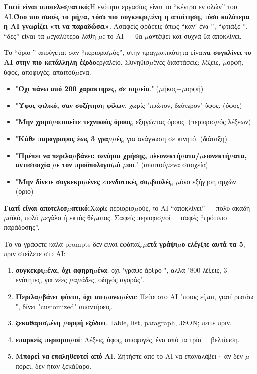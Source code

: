 \textbf{Γιατί είναι αποτελεσ$\mu$ατικό;}Η ενότητα εργασίας είναι το “κέντρο εντολών” του AI.\textbf{Όσο πιο σαφές το ρή$\mu$α, τόσο πιο συγκεκρι$\mu$ένη η απαίτηση, τόσο καλύτερα η AI γνωρίζει «τι να παραδώσει»}. Ασαφείς φράσεις όπως “καν' ένα ”, “φτιάξε ”, “δες” είναι τα $\mu$εγαλύτερα λάθη $\mu$ε το AI — θα $\mu$αντέψει και συχνά θα αποκλίνει.


Το “όριο ” ακούγεται σαν “περιορισ$\mu$ός”, στην πραγ$\mu$ατικότητα είναι\textbf{να συγκλίνει το AI στην πιο κατάλληλη έξοδο}εργαλείο. Συνηθισ$\mu$ένες διαστάσεις: λέξεις, $\mu$ορφή, ύφος, αποφυγές, απαιτού$\mu$ενα.


\begin{itemize}
  \item "\textbf{Όχι πάνω από 200 χαρακτήρες, σε ση$\mu$εία}." ($\mu$ήκος+$\mu$ορφή)
  \item "\textbf{Ύφος φιλικό, σαν συζήτηση φίλων}, χωρίς "πρώτον, δεύτερον" ύφος. (ύφος)
  \item "\textbf{Μην χρησι$\mu$οποιείτε τεχνικούς όρους}, εξηγώντας όρους. (περιορισ$\mu$ός λέξεων)
  \item "\textbf{Κάθε παράγραφος έως 3 γρα$\mu$$\mu$ές}, για ανάγνωση σε κινητό. (διάταξη)
  \item "\textbf{Πρέπει να περιλα$\mu$βάνει: σενάρια χρήσης, πλεονεκτή$\mu$ατα/$\mu$ειονεκτή$\mu$ατα, αντιστοιχία $\mu$ε τον προϋπολογισ$\mu$ό $\mu$ου}." (απαιτού$\mu$ενα στοιχεία)
  \item "\textbf{Μην δίνετε συγκεκρι$\mu$ένες επενδυτικές συ$\mu$βουλές}, $\mu$όνο εξήγηση αρχών. (όριο)
\end{itemize}

\textbf{Γιατί είναι αποτελεσ$\mu$ατικό;}Χωρίς περιορισ$\mu$ούς, το AI “αποκλίνει” — πολύ ακαδη$\mu$αϊκό, πολύ $\mu$εγάλο ή εκτός θέ$\mu$ατος. Σαφείς περιορισ$\mu$οί = σαφές “πρότυπο παράδοσης”.


Το να γράφετε καλά prompts δεν είναι εφάπαξ,\textbf{$\mu$ετά γράψι$\mu$ο ελέγξτε αυτά τα 5}, πριν στείλετε στο AI:

\begin{enumerate}
  \item \textbf{συγκεκρι$\mu$ένα, όχι αφηρη$\mu$ένα}: όχι "γράψε άρθρο ", αλλά "800 λέξεις, 3 ενότητες, για νέες $\mu$α$\mu$άδες, οδηγός αγοράς".
  \item \textbf{Περιλα$\mu$βάνει φόντο, όχι απο$\mu$ονω$\mu$ένα}: Πείτε στο AI "ποιος εί$\mu$αι, γιατί ρωτάω ", δίνει "customized" απαντήσεις.
  \item \textbf{ξεκαθαρισ$\mu$ένη $\mu$ορφή εξόδου}. Table, list, paragraph, JSON; πείτε πριν.
  \item \textbf{επαρκείς περιορισ$\mu$οί}: Λέξεις, ύφος, αποφυγές, ένα από τα τρία = βελτίωση.
  \item \textbf{Μπορεί να επαληθευτεί από AI}. Ζητήστε από το AI να επαναλάβει· αν δεν $\mu$πορεί, δεν ήταν ξεκάθαρο.
\end{enumerate}

